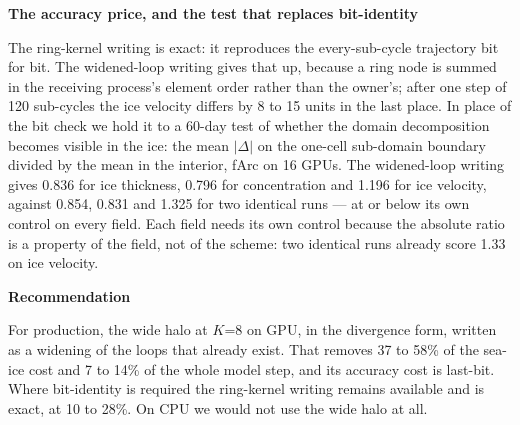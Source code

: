 \documentclass[10pt,a4paper]{article}
\newcommand{\hd}[1]{\vspace{0.2em}\textbf{\large #1}\par\vspace{0.05em}}
\begin{document}
\hd{The accuracy price, and the test that replaces bit-identity}

The ring-kernel writing is exact: it reproduces the every-sub-cycle trajectory bit for bit. The
widened-loop writing gives that up, because a ring node is summed in the receiving process's
element order rather than the owner's; after one step of 120 sub-cycles the ice velocity differs by
8 to 15 units in the last place. In place of the bit check we hold it to a 60-day test of whether
the domain decomposition becomes visible in the ice: the mean $|\Delta|$ on the one-cell sub-domain
boundary divided by the mean in the interior, fArc on 16 GPUs. The widened-loop writing gives 0.836
for ice thickness, 0.796 for concentration and 1.196 for ice velocity, against 0.854, 0.831 and
1.325 for two identical runs --- at or below its own control on every field. Each field needs its
own control because the absolute ratio is a property of the field, not of the scheme: two identical
runs already score 1.33 on ice velocity.

\hd{Recommendation}

For production, the wide halo at $K$=8 on GPU, in the divergence form, written as a widening of the
loops that already exist. That removes 37 to 58\% of the sea-ice cost and 7 to 14\% of the whole
model step, and its accuracy cost is last-bit. Where bit-identity is required the ring-kernel
writing remains available and is exact, at 10 to 28\%. On CPU we would not use the wide halo at
all.
\end{document}
